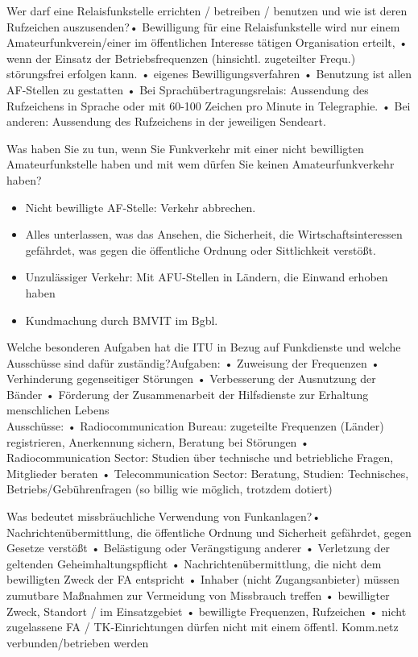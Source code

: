 \documentclass[avery5371,grid,frame,a4paper]{flashcards}
\newcommand{\card}[3]{
  \begin{flashcard}[{\chap} -- #1]{#2}#3\end{flashcard}
}
\begin{document}
\card{52}{Wer darf eine Relaisfunkstelle errichten / betreiben / benutzen und wie ist deren Rufzeichen auszusenden?}{• Bewilligung für eine Relaisfunkstelle wird nur einem
Amateurfunkverein/einer im öffentlichen Interesse tätigen Organisation erteilt,
• wenn der Einsatz der Betriebsfrequenzen (hinsichtl. zugeteilter Frequ.) störungsfrei erfolgen kann.
• eigenes Bewilligungsverfahren
• Benutzung ist allen AF-Stellen zu gestatten
• Bei Sprachübertragungsrelais: Aussendung des Rufzeichens in Sprache oder mit 60-100 Zeichen pro Minute in Telegraphie.
• Bei anderen: Aussendung des Rufzeichens in der jeweiligen Sendeart.}

\card{53}{Was haben Sie zu tun, wenn Sie Funkverkehr mit einer nicht bewilligten Amateurfunkstelle haben und mit wem dürfen Sie keinen Amateurfunkverkehr haben?}{\begin{itemize}\itemsep1pt \item Nicht bewilligte AF-Stelle: Verkehr abbrechen. \item Alles unterlassen, was das Ansehen, die Sicherheit, die Wirtschaftsinteressen gefährdet, was gegen die öffentliche Ordnung oder Sittlichkeit verstößt. \item Unzulässiger Verkehr: Mit AFU-Stellen in Ländern, die Einwand erhoben haben \item Kundmachung durch BMVIT im Bgbl.\end{itemize}}

\card{54}{Welche besonderen Aufgaben hat die ITU in Bezug auf Funkdienste und welche Ausschüsse sind dafür zuständig?}{\small{Aufgaben:
•  Zuweisung der Frequenzen
•  Verhinderung gegenseitiger Störungen
•  Verbesserung der Ausnutzung der Bänder
•  Förderung der Zusammenarbeit der Hilfsdienste zur Erhaltung menschlichen Lebens \\
Ausschüsse:
•  Radiocommunication Bureau: zugeteilte Frequenzen (Länder) registrieren, Anerkennung sichern, Beratung bei Störungen
•  Radiocommunication Sector: Studien über technische und betriebliche Fragen, Mitglieder beraten
•  Telecommunication Sector: Beratung, Studien: Technisches, Betriebs/Gebührenfragen (so billig wie möglich, trotzdem dotiert)}}

\card{55}{Was bedeutet missbräuchliche Verwendung von Funkanlagen?}{\small{• Nachrichtenübermittlung, die öffentliche Ordnung und Sicherheit gefährdet, gegen Gesetze verstößt
• Belästigung oder Verängstigung anderer
• Verletzung der geltenden Geheimhaltungspflicht
• Nachrichtenübermittlung, die nicht dem bewilligten Zweck der FA entspricht
• Inhaber (nicht Zugangsanbieter) müssen zumutbare Maßnahmen zur Vermeidung von Missbrauch treffen
• bewilligter Zweck, Standort / im Einsatzgebiet
• bewilligte Frequenzen, Rufzeichen
• nicht zugelassene FA / TK-Einrichtungen dürfen nicht mit einem öffentl. Komm.netz verbunden/betrieben werden}}
\end{document}
